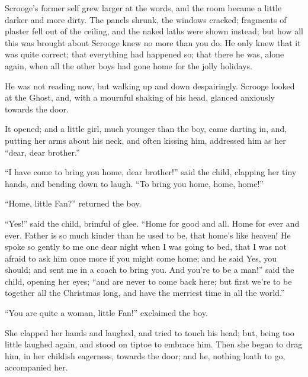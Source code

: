 \documentclass[paper=5.5in:8.5in,BCOR=5mm,twoside,DIV=calc,12pt,usegeometry]{scrbook} %
\begin{document}
Scrooge's former self grew larger at the words, and the room became a little darker and more dirty. The panels shrunk, the windows cracked; fragments of plaster fell out of the ceiling, and the naked laths were shown instead; but how all this was brought about Scrooge knew no more than you do. He only knew that it was quite correct; that everything had happened so; that there he was, alone again, when all the other boys had gone home for the jolly holidays.

He was not reading now, but walking up and down despairingly. Scrooge looked at the Ghost, and, with a mournful shaking of his head, glanced anxiously towards the door.

It opened; and a little girl, much younger than the boy, came darting in, and, putting her arms about his neck, and often kissing him, addressed him as her \enquote{dear, dear brother.}

\enquote{I have come to bring you home, dear brother!} said the child, clapping her tiny hands, and bending down to laugh. \enquote{To bring you home, home, home!}

\enquote{Home, little Fan?} returned the boy.

\enquote{Yes!} said the child, brimful of glee. \enquote{Home for good and all. Home for ever and ever. Father is so much kinder than he used to be, that home's like heaven! He spoke so gently to me one dear night when I was going to bed, that I was not afraid to ask him once more if you might come home; and he said Yes, you should; and sent me in a coach to bring you. And you're to be a man!} said the child, opening her eyes; \enquote{and are never to come back here; but first we're to be together all the Christmas long, and have the merriest time in all the world.}

\enquote{You are quite a woman, little Fan!} exclaimed the boy.

She clapped her hands and laughed, and tried to touch his head; but, being too little laughed again, and stood on tiptoe to embrace him. Then she began to drag him, in her childish eagerness, towards the door; and he, nothing loath to go, accompanied her.
\end{document}
